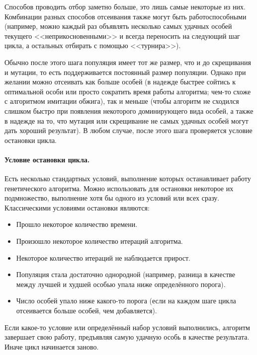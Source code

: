 \documentclass[12pt,fleqn]{article}
\begin{document}
	Способов проводить отбор заметно больше, это лишь самые некоторые из них. Комбинации разных способов отсеивания также могут быть работоспособными (например, можно каждый раз объявлять несколько самых удачных особей текущего <<неприкосновенными>> и всегда переносить на следующий шаг цикла, а остальных отбирать с помощью <<турнира>>).

	Обычно после этого шага популяция имеет тот же размер, что и до скрещивания и мутации, то есть поддерживается постоянный размер популяции. Однако при желании можно отсеивать как больше особей (в надежде быстрее сойтись к оптимальной особи или просто сократить время работы алгоритма; чем-то схоже с алгоритмом имитации обжига), так и меньше (чтобы алгоритм не сходился слишком быстро при появления некоторого доминирующего вида особей, а также в надежде на то, что мутация или скрещивание не самых удачных особей могут дать хороший результат). В любом случае, после этого шага проверяется условие остановки цикла.

	\paragraph*{Условие остановки цикла.} Есть несколько стандартных условий, выполнение которых останавливает работу генетического алгоритма. Можно использовать для остановки некоторое их подмножество, выполнение хотя бы одного из условий или всех сразу. Классическими условиями остановки являются:
	\begin{itemize}
		\item Прошло некоторое количество времени.
		\item Произошло некоторое количество итераций алгоритма.
		\item Некоторое количество итераций не наблюдается прирост.
		\item Популяция стала достаточно однородной (например, разница в качестве между лучшей и худшей особью упала ниже определённого порога).
		\item Число особей упало ниже какого-то порога (если на каждом шаге цикла отсеивается больше особей, чем добавляется).
	\end{itemize}

	Если какое-то условие или определённый набор условий выполнились, алгоритм завершает свою работу, предъявляя самую удачную особь в качестве результата. Иначе цикл начинается заново.
\end{document}
